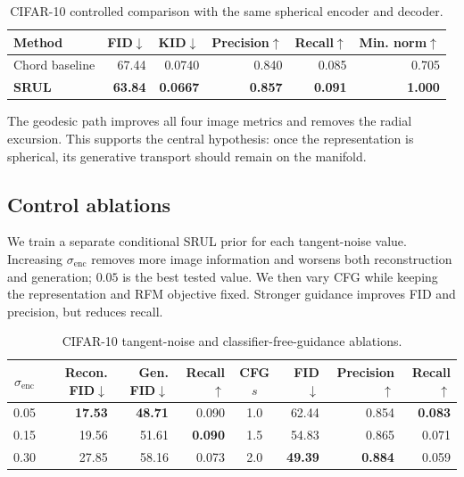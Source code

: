 \documentclass{article}
\begin{document}
\begin{table}[H]
\centering
\small
\caption{CIFAR-10 controlled comparison with the same spherical encoder and decoder.}
\label{tab:geometry}
\setlength{\tabcolsep}{8.0pt}
\begin{tabular}{lrrrrr}
\toprule
Method & FID$\downarrow$ & KID$\downarrow$ & Precision$\uparrow$ & Recall$\uparrow$ & Min. norm$\uparrow$ \\
\midrule
Chord baseline & 67.44 & 0.0740 & 0.840 & 0.085 & 0.705 \\
\textbf{SRUL} & \textbf{63.84} & \textbf{0.0667} & \textbf{0.857} & \textbf{0.091} & \textbf{1.000} \\
\bottomrule
\end{tabular}
\end{table}

The geodesic path improves all four image metrics and removes the radial excursion. This supports the central hypothesis: once the representation is spherical, its generative transport should remain on the manifold.

\subsection*{Control ablations}
We train a separate conditional SRUL prior for each tangent-noise value. Increasing $\sigma_{\mathrm{enc}}$ removes more image information and worsens both reconstruction and generation; $0.05$ is the best tested value. We then vary CFG while keeping the representation and RFM objective fixed. Stronger guidance improves FID and precision, but reduces recall.

\begin{table}[H]
\centering
\small
\caption{CIFAR-10 tangent-noise and classifier-free-guidance ablations.}
\label{tab:controls}
\setlength{\tabcolsep}{5.5pt}
\begin{tabular}{crrr|crrr}
\toprule
$\sigma_{\mathrm{enc}}$ & Recon. FID$\downarrow$ & Gen. FID$\downarrow$ & Recall$\uparrow$ & CFG $s$ & FID$\downarrow$ & Precision$\uparrow$ & Recall$\uparrow$ \\
\midrule
0.05 & \textbf{17.53} & \textbf{48.71} & 0.090 & 1.0 & 62.44 & 0.854 & \textbf{0.083} \\
0.15 & 19.56 & 51.61 & \textbf{0.090} & 1.5 & 54.83 & 0.865 & 0.071 \\
0.30 & 27.85 & 58.16 & 0.073 & 2.0 & \textbf{49.39} & \textbf{0.884} & 0.059 \\
\bottomrule
\end{tabular}
\end{table}
\end{document}
